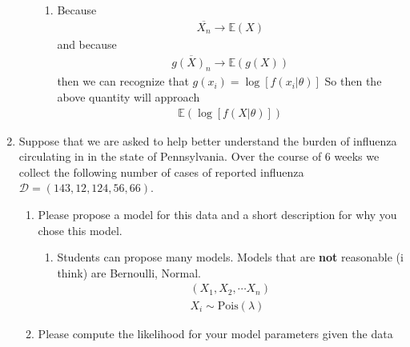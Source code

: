 \documentclass[krantz1,ChapterTOCs]{krantz}
\begin{document}
\begin{enumerate}
\begin{enumerate}
        \begin{enumerate}
            \item {\color{red}
                Because 
                \begin{align*}
                    \overline{X_{n}} \to \mathbb{E}(X)
                \end{align*}
                and because
                \begin{align*}
                    \overline{g(X)_{n}} \to \mathbb{E}(g(X))
                \end{align*}
                then we can recognize that $g(x_{i}) = \log\left[f(x_{i}| \theta) \right]$
                So then the above quantity will approach  
                \begin{align}
                    \mathbb{E}\left( \log\left[f(X| \theta) \right]\right)
                \end{align}
            }
        \end{enumerate}
        
    \end{enumerate}
    
    \item Suppose that we are asked to help better understand the burden of influenza circulating in in the state of Pennsylvania. 
    Over the course of 6 weeks we collect the following number of cases of reported influenza $\mathcal{D} = (143, 12, 124, 56, 66)$. 
    \begin{enumerate}
        \item Please propose a model for this data and a short description for why you chose this model. 
        
        \begin{enumerate}
            \item {\color{red} 
                Students can propose many models. Models that are \textbf{not} reasonable (i think) are Bernoulli, Normal. 
                \begin{align*}
                    (X_{1},X_{2},\cdots X_{n})\\
                    X_{i} \sim \text{Pois}(\lambda)
                \end{align*}
            }
        \end{enumerate}
        
        \item Please compute the likelihood for your model parameters given the data
        

\end{enumerate}
\end{enumerate}
\end{document}
